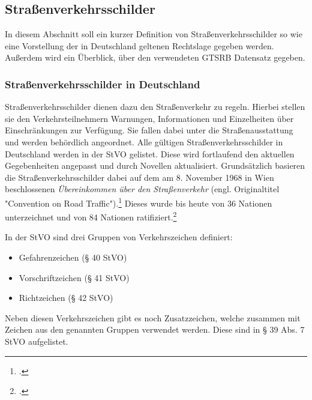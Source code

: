 \subsection{Straßenverkehrsschilder}
In diesem Abschnitt soll ein kurzer Definition von Straßenverkehrsschilder so wie eine Vorstellung der in Deutschland geltenen Rechtslage gegeben werden. Außerdem wird ein Überblick, über den verwendeten \ac{GTSRB} Datensatz gegeben.

\subsubsection{Straßenverkehrsschilder in Deutschland}
Straßenverkehrsschilder dienen dazu den Straßenverkehr zu regeln. Hierbei stellen sie den Verkehrsteilnehmern Warnungen, Informationen und Einzelheiten über Einschränkungen zur Verfügung. Sie fallen dabei unter die Straßenausstattung und werden behördlich angeordnet.  Alle gültigen Straßenverkehrsschilder in Deutschland werden in der \ac{StVO} gelistet. Diese wird fortlaufend den aktuellen Gegebenheiten angepasst und durch Novellen aktualisiert. Grundsätzlich basieren die Straßenverkehrsschilder dabei auf dem am 8. November 1968 in Wien beschlossenen \textit{Übereinkommen über den Straßenverkehr} (engl. Originaltitel "Convention on Road Traffic").\footcite[Vgl.][o.S.]{unConventionRoadTraffic1977} 
 Dieses wurde bis heute von 36 Nationen unterzeichnet und von 84 Nationen ratifiziert.\footcite[Vgl.][1-14]{unUnitedNationsTreaty2020}

In der \ac{StVO} sind drei Gruppen von Verkehrszeichen definiert:
\begin{itemize}
    \item Gefahrenzeichen (§ 40 \ac{StVO})
    \item Vorschriftzeichen (§ 41 \ac{StVO})
    \item Richtzeichen (§ 42 \ac{StVO})
\end{itemize}

Neben diesen Verkehrszeichen gibt es noch Zusatzzeichen, welche zusammen mit Zeichen aus den genannten Gruppen verwendet werden. Diese sind in § 39 Abs. 7 \ac{StVO} aufgelistet.


